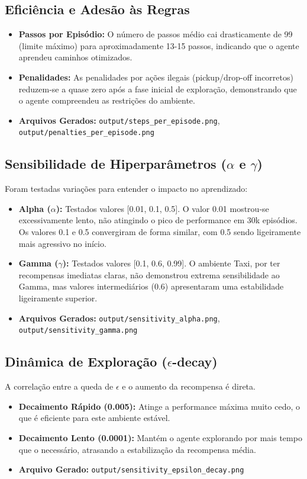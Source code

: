\documentclass{article}
\begin{document}
\subsection{Eficiência e Adesão às Regras}
\begin{itemize}
    \item \textbf{Passos por Episódio:} O número de passos médio cai drasticamente de 99 (limite máximo) para aproximadamente 13-15 passos, indicando que o agente aprendeu caminhos otimizados.
    \item \textbf{Penalidades:} As penalidades por ações ilegais (pickup/drop-off incorretos) reduzem-se a quase zero após a fase inicial de exploração, demonstrando que o agente compreendeu as restrições do ambiente.
    \item \textbf{Arquivos Gerados:} \texttt{output/steps\_per\_episode.png}, \texttt{output/penalties\_per\_episode.png}
\end{itemize}

\subsection{Sensibilidade de Hiperparâmetros ($\alpha$ e $\gamma$)}
Foram testadas variações para entender o impacto no aprendizado:
\begin{itemize}
    \item \textbf{Alpha ($\alpha$):} Testados valores [0.01, 0.1, 0.5]. O valor 0.01 mostrou-se excessivamente lento, não atingindo o pico de performance em 30k episódios. Os valores 0.1 e 0.5 convergiram de forma similar, com 0.5 sendo ligeiramente mais agressivo no início.
    \item \textbf{Gamma ($\gamma$):} Testados valores [0.1, 0.6, 0.99]. O ambiente Taxi, por ter recompensas imediatas claras, não demonstrou extrema sensibilidade ao Gamma, mas valores intermediários (0.6) apresentaram uma estabilidade ligeiramente superior.
    \item \textbf{Arquivos Gerados:} \texttt{output/sensitivity\_alpha.png}, \texttt{output/sensitivity\_gamma.png}
\end{itemize}

\subsection{Dinâmica de Exploração ($\epsilon$-decay)}
A correlação entre a queda de $\epsilon$ e o aumento da recompensa é direta. 
\begin{itemize}
    \item \textbf{Decaimento Rápido (0.005):} Atinge a performance máxima muito cedo, o que é eficiente para este ambiente estável.
    \item \textbf{Decaimento Lento (0.0001):} Mantém o agente explorando por mais tempo que o necessário, atrasando a estabilização da recompensa média.
    \item \textbf{Arquivo Gerado:} \texttt{output/sensitivity\_epsilon\_decay.png}
\end{itemize}
\end{document}
